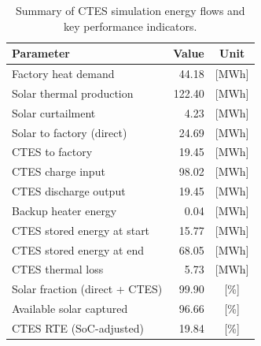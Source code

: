 \renewcommand{\arraystretch}{1.2}
\begin{table}[h]
\centering
\begin{tabular}{l|r c}
\hline
Parameter & Value & Unit \\
\hline
Factory heat demand & 44.18 & [MWh] \\
Solar thermal production & 122.40 & [MWh] \\
Solar curtailment & 4.23 & [MWh] \\
Solar to factory (direct) & 24.69 & [MWh] \\
CTES to factory & 19.45 & [MWh] \\
CTES charge input & 98.02 & [MWh] \\
CTES discharge output & 19.45 & [MWh] \\
Backup heater energy & 0.04 & [MWh] \\
CTES stored energy at start & 15.77 & [MWh] \\
CTES stored energy at end & 68.05 & [MWh] \\
CTES thermal loss & 5.73 & [MWh] \\
\hline
Solar fraction (direct + CTES) & 99.90 & [\%] \\
Available solar captured & 96.66 & [\%] \\
CTES RTE (SoC-adjusted) & 19.84 & [\%] \\
\hline
\end{tabular}
\caption{Summary of CTES simulation energy flows and key performance indicators.}
\label{tab:ctes-simulation-summary}
\end{table}
